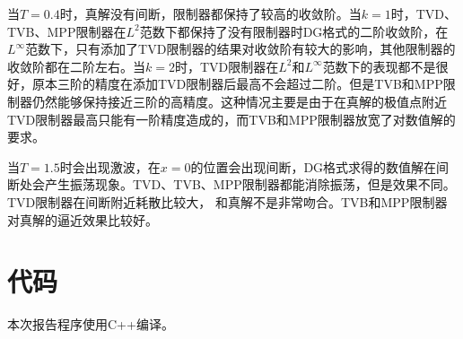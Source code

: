 \documentclass[12pt, a4paper]{ctexart}
\begin{document}
	当$T=0.4$时，真解没有间断，限制器都保持了较高的收敛阶。当$k=1$时，TVD、TVB、MPP限制器在$L^2$范数下都保持了没有限制器时DG格式的二阶收敛阶，在$L^\infty$范数下，只有添加了TVD限制器的结果对收敛阶有较大的影响，其他限制器的收敛阶都在二阶左右。当$k=2$时，TVD限制器在$L^2$和$L^\infty$范数下的表现都不是很好，原本三阶的精度在添加TVD限制器后最高不会超过二阶。但是TVB和MPP限制器仍然能够保持接近三阶的高精度。这种情况主要是由于在真解的极值点附近TVD限制器最高只能有一阶精度造成的，而TVB和MPP限制器放宽了对数值解的要求。
	
	当$T=1.5$时会出现激波，在$x=0$的位置会出现间断，DG格式求得的数值解在间断处会产生振荡现象。TVD、TVB、MPP限制器都能消除振荡，但是效果不同。TVD限制器在间断附近耗散比较大， 和真解不是非常吻合。TVB和MPP限制器对真解的逼近效果比较好。
	
	\section{代码}
	本次报告程序使用C++编译。
	
	\appendix
	
\end{document}

